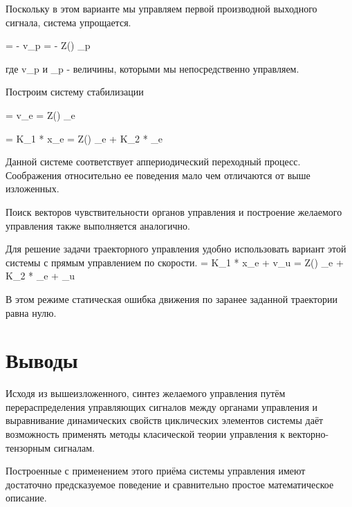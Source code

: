 \documentclass[a4paper]{article}
\begin{document}
Поскольку в этом варианте мы управляем первой производной выходного сигнала, система упрощается.

 = - v_p
 = - Z(\theta) \omega_p

где v_p и \omega_p - величины, которыми мы непосредственно управляем.

Построим систему стабилизации

 = v_e
 = Z(\theta) \omega_e

 = K_1 * x_e
 = Z(\theta) \omega_e + K_2 * \theta_e

Данной системе соответствует аппериодический переходный процесс. Соображения относительно ее поведения мало чем отличаются от выше изложенных.

Поиск векторов чувствительности органов управления и построение желаемого управления также выполняется аналогично.

Для решение задачи траекторного управления удобно использовать вариант этой системы с прямым управлением по скорости.
 = K_1 * x_e + v_u
 = Z(\theta) \omega_e + K_2 * \theta_e + \omega_u

В этом режиме статическая ошибка движения по заранее заданной траектории равна нулю.

\section{Выводы}
Исходя из вышеизложенного, синтез желаемого управления путём перераспределения управляющих сигналов между органами управления и выравнивание динамических свойств циклических элементов системы даёт возможность применять методы класической теории управления к векторно-тензорным сигналам.

Построенные с применением этого приёма системы управления имеют достаточно предсказуемое поведение и сравнительно простое математическое описание.
\end{document}

